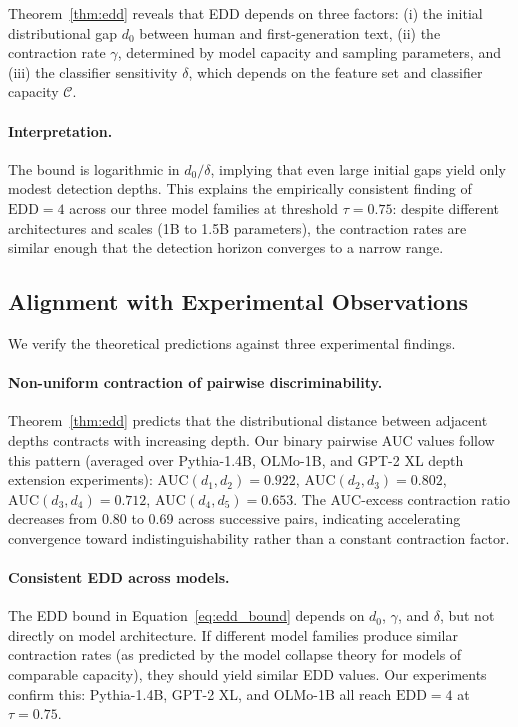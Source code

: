 Theorem~\ref{thm:edd} reveals that EDD depends on three factors: (i) the initial distributional gap $d_0$ between human and first-generation text, (ii) the contraction rate $\gamma$, determined by model capacity and sampling parameters, and (iii) the classifier sensitivity $\delta$, which depends on the feature set and classifier capacity $\mathcal{C}$.

\paragraph{Interpretation.} The bound is logarithmic in $d_0/\delta$, implying that even large initial gaps yield only modest detection depths. This explains the empirically consistent finding of $\text{EDD} = 4$ across our three model families at threshold $\tau = 0.75$: despite different architectures and scales (1B to 1.5B parameters), the contraction rates are similar enough that the detection horizon converges to a narrow range.

\subsection{Alignment with Experimental Observations}
\label{sec:theory:validation}

We verify the theoretical predictions against three experimental findings.

\paragraph{Non-uniform contraction of pairwise discriminability.}
Theorem~\ref{thm:edd} predicts that the distributional distance between adjacent depths contracts with increasing depth. Our binary pairwise AUC values follow this pattern (averaged over Pythia-1.4B, OLMo-1B, and GPT-2 XL depth extension experiments): $\text{AUC}(d_1, d_2) = 0.922$, $\text{AUC}(d_2, d_3) = 0.802$, $\text{AUC}(d_3, d_4) = 0.712$, $\text{AUC}(d_4, d_5) = 0.653$. The AUC-excess contraction ratio decreases from 0.80 to 0.69 across successive pairs, indicating accelerating convergence toward indistinguishability rather than a constant contraction factor.

\paragraph{Consistent EDD across models.}
The EDD bound in Equation~\eqref{eq:edd_bound} depends on $d_0$, $\gamma$, and $\delta$, but not directly on model architecture. If different model families produce similar contraction rates (as predicted by the model collapse theory for models of comparable capacity), they should yield similar EDD values. Our experiments confirm this: Pythia-1.4B, GPT-2 XL, and OLMo-1B all reach $\text{EDD} = 4$ at $\tau = 0.75$.


